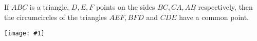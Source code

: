 \documentclass{article}
\newcommand{\figura}[1]{\begin{center}\texttt{[image: \#1]}\end{center}}
\begin{document}
If $ABC$ is a triangle, $D,E,F$ points on the sides $BC, CA, AB$ respectively, then the circumcircles of the triangles $AEF, BFD$ and  $CDE$ have a common point.
\figura{pivot}
\end{document}
